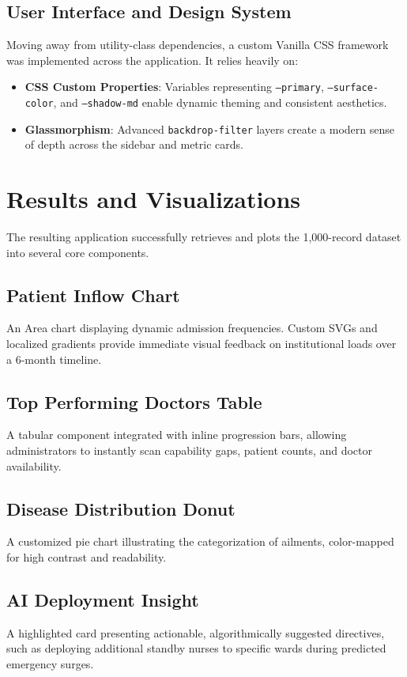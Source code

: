 \documentclass[12pt,a4paper]{report}
\begin{document}
\section{User Interface and Design System}
Moving away from utility-class dependencies, a custom Vanilla CSS framework was implemented across the application. It relies heavily on:
\begin{itemize}
    \item \textbf{CSS Custom Properties}: Variables representing \texttt{--primary}, \texttt{--surface-color}, and \texttt{--shadow-md} enable dynamic theming and consistent aesthetics.
    \item \textbf{Glassmorphism}: Advanced \texttt{backdrop-filter} layers create a modern sense of depth across the sidebar and metric cards.
\end{itemize}

\chapter{Results and Visualizations}
The resulting application successfully retrieves and plots the 1,000-record dataset into several core components.

\section{Patient Inflow Chart} 
An Area chart displaying dynamic admission frequencies. Custom SVGs and localized gradients provide immediate visual feedback on institutional loads over a 6-month timeline.

\section{Top Performing Doctors Table} 
A tabular component integrated with inline progression bars, allowing administrators to instantly scan capability gaps, patient counts, and doctor availability.

\section{Disease Distribution Donut} 
A customized pie chart illustrating the categorization of ailments, color-mapped for high contrast and readability.

\section{AI Deployment Insight} 
A highlighted card presenting actionable, algorithmically suggested directives, such as deploying additional standby nurses to specific wards during predicted emergency surges.
\end{document}
